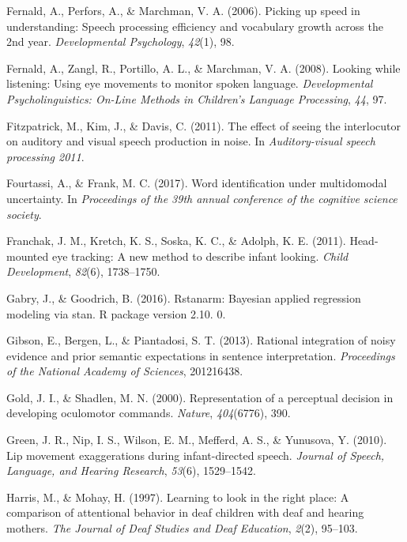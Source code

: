 \documentclass[,man,floatsintext]{apa6}
\begin{document}
\leavevmode\hypertarget{ref-fernald2006picking}{}%
Fernald, A., Perfors, A., \& Marchman, V. A. (2006). Picking up speed in understanding: Speech processing efficiency and vocabulary growth across the 2nd year. \emph{Developmental Psychology}, \emph{42}(1), 98.

\leavevmode\hypertarget{ref-fernald2008looking}{}%
Fernald, A., Zangl, R., Portillo, A. L., \& Marchman, V. A. (2008). Looking while listening: Using eye movements to monitor spoken language. \emph{Developmental Psycholinguistics: On-Line Methods in Children's Language Processing}, \emph{44}, 97.

\leavevmode\hypertarget{ref-fitzpatrick2011effect}{}%
Fitzpatrick, M., Kim, J., \& Davis, C. (2011). The effect of seeing the interlocutor on auditory and visual speech production in noise. In \emph{Auditory-visual speech processing 2011}.

\leavevmode\hypertarget{ref-fourtassiword2018}{}%
Fourtassi, A., \& Frank, M. C. (2017). Word identification under multidomodal uncertainty. In \emph{Proceedings of the 39th annual conference of the cognitive science society}.

\leavevmode\hypertarget{ref-franchak2011head}{}%
Franchak, J. M., Kretch, K. S., Soska, K. C., \& Adolph, K. E. (2011). Head-mounted eye tracking: A new method to describe infant looking. \emph{Child Development}, \emph{82}(6), 1738--1750.

\leavevmode\hypertarget{ref-gabry2016rstanarm}{}%
Gabry, J., \& Goodrich, B. (2016). Rstanarm: Bayesian applied regression modeling via stan. R package version 2.10. 0.

\leavevmode\hypertarget{ref-gibson2013rational}{}%
Gibson, E., Bergen, L., \& Piantadosi, S. T. (2013). Rational integration of noisy evidence and prior semantic expectations in sentence interpretation. \emph{Proceedings of the National Academy of Sciences}, 201216438.

\leavevmode\hypertarget{ref-gold2000representation}{}%
Gold, J. I., \& Shadlen, M. N. (2000). Representation of a perceptual decision in developing oculomotor commands. \emph{Nature}, \emph{404}(6776), 390.

\leavevmode\hypertarget{ref-green2010lip}{}%
Green, J. R., Nip, I. S., Wilson, E. M., Mefferd, A. S., \& Yunusova, Y. (2010). Lip movement exaggerations during infant-directed speech. \emph{Journal of Speech, Language, and Hearing Research}, \emph{53}(6), 1529--1542.

\leavevmode\hypertarget{ref-harris1997learning}{}%
Harris, M., \& Mohay, H. (1997). Learning to look in the right place: A comparison of attentional behavior in deaf children with deaf and hearing mothers. \emph{The Journal of Deaf Studies and Deaf Education}, \emph{2}(2), 95--103.
\end{document}
